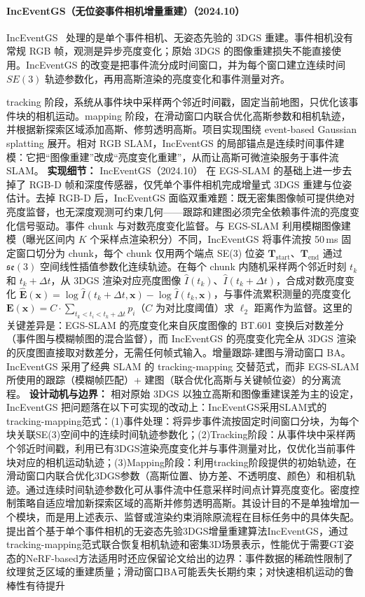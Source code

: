\paragraph{IncEventGS（无位姿事件相机增量重建）（2024.10）}
IncEventGS~\cite{2410_08107} 处理的是单个事件相机、无姿态先验的 3DGS 重建。事件相机没有常规 RGB 帧，观测是异步亮度变化；原始 3DGS 的图像重建损失不能直接使用。IncEventGS 的改变是把事件流分成时间窗口，并为每个窗口建立连续时间 $SE(3)$ 轨迹参数化，再用高斯渲染的亮度变化和事件测量对齐。

tracking 阶段，系统从事件块中采样两个邻近时间戳，固定当前地图，只优化该事件块的相机运动。mapping 阶段，在滑动窗口内联合优化高斯参数和相机轨迹，并根据新探索区域添加高斯、修剪透明高斯。项目实现围绕 event-based Gaussian splatting 展开。相对 RGB SLAM，IncEventGS 的局部锚点是连续时间事件建模：它把“图像重建”改成“亮度变化重建”，从而让高斯可微渲染服务于事件流 SLAM。
\textbf{实现细节：} IncEventGS（2024.10） 在 EGS-SLAM 的基础上进一步去掉了 RGB-D 帧和深度传感器，仅凭单个事件相机完成增量式 3DGS 重建与位姿估计。去掉 RGB-D 后，IncEventGS 面临双重难题：既无密集图像帧可提供绝对亮度监督，也无深度观测可约束几何——跟踪和建图必须完全依赖事件流的亮度变化信号驱动。事件 chunk 与对数亮度变化监督。与 EGS-SLAM 利用模糊图像建模（曝光区间内 $K$ 个采样点渲染积分）不同，IncEventGS 将事件流按 50\,ms 固定窗口切分为 chunk，每个 chunk 仅用两个端点 SE(3) 位姿 $\mathbf{T}_\mathrm{start}$、$\mathbf{T}_\mathrm{end}$ 通过 $\mathfrak{se}(3)$ 空间线性插值参数化连续轨迹。在每个 chunk 内随机采样两个邻近时刻 $t_k$ 和 $t_k{+}\Delta t$，从 3DGS 渲染对应亮度图像 $\hat{I}(t_k)$、$\hat{I}(t_k{+}\Delta t)$，合成对数亮度变化 $\hat{\mathbf{E}}(\mathbf{x}) = \log \hat{I}(t_k{+}\Delta t, \mathbf{x}) - \log \hat{I}(t_k, \mathbf{x})$，与事件流累积测量的亮度变化 $\mathbf{E}(\mathbf{x}) = C \cdot \sum_{t_k < t_i < t_k{+}\Delta t} p_i$（$C$ 为对比度阈值）求 $\ell_2$ 距离作为监督。这里的关键差异是：EGS-SLAM 的亮度变化来自灰度图像的 BT.601 变换后对数差分（事件图与模糊帧图的混合监督），而 IncEventGS 的亮度变化完全从 3DGS 渲染的灰度图直接取对数差分，无需任何帧式输入。增量跟踪-建图与滑动窗口 BA。IncEventGS 采用了经典 SLAM 的 tracking-mapping 交替范式，而非 EGS-SLAM 所使用的跟踪（模糊帧匹配）+ 建图（联合优化高斯与关键帧位姿）的分离流程。
\textbf{设计动机与边界：} 相对原始 3DGS 以独立高斯和图像重建误差为主的设定，IncEventGS 把问题落在以下可实现的改动上：IncEventGS采用SLAM式的tracking-mapping范式：(1)事件处理：将异步事件流按固定时间窗口分块，为每个块关联SE(3)空间中的连续时间轨迹参数化；(2)Tracking阶段：从事件块中采样两个邻近时间戳，利用已有3DGS渲染亮度变化并与事件测量对比，仅优化当前事件块对应的相机运动轨迹；(3)Mapping阶段：利用tracking阶段提供的初始轨迹，在滑动窗口内联合优化3DGS参数（高斯位置、协方差、不透明度、颜色）和相机轨迹。通过连续时间轨迹参数化可从事件流中任意采样时间点计算亮度变化。密度控制策略自适应增加新探索区域的高斯并修剪透明高斯。其设计目的不是单独增加一个模块，而是用上述表示、监督或渲染约束消除原流程在目标任务中的具体失配。提出首个基于单个事件相机的无姿态先验3DGS增量重建算法IncEventGS，通过tracking-mapping范式联合恢复相机轨迹和密集3D场景表示，性能优于需要GT姿态的NeRF-based方法适用时还应保留论文给出的边界：事件数据的稀疏性限制了纹理贫乏区域的重建质量；滑动窗口BA可能丢失长期约束；对快速相机运动的鲁棒性有待提升
